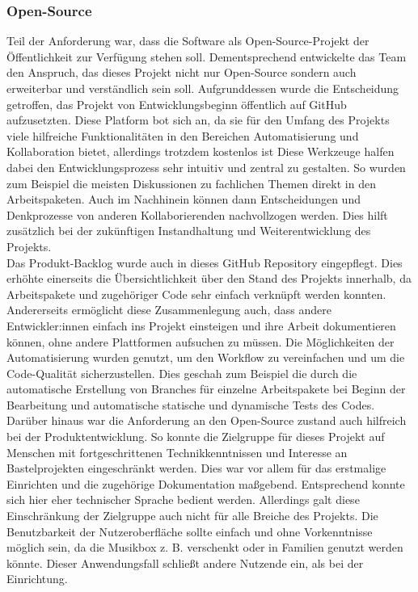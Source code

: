 \documentclass[10pt, a4paper, draft]{article}
\begin{document}
\subsubsection{Open-Source}
Teil der Anforderung war, dass die Software als Open-Source-Projekt der Öffentlichkeit zur Verfügung stehen soll.
Dementsprechend entwickelte das Team den Anspruch, das dieses Projekt nicht nur Open-Source sondern auch erweiterbar und verständlich sein soll.
Aufgrunddessen wurde die Entscheidung getroffen, das Projekt von Entwicklungsbeginn öffentlich auf GitHub aufzusetzten.
Diese Platform bot sich an, da sie für den Umfang des Projekts viele hilfreiche Funktionalitäten in den Bereichen Automatisierung und Kollaboration bietet, allerdings trotzdem kostenlos ist
Diese Werkzeuge halfen dabei den Entwicklungsprozess sehr intuitiv und zentral zu gestalten.
So wurden zum Beispiel die meisten Diskussionen zu fachlichen Themen direkt in den Arbeitspaketen.
Auch im Nachhinein können dann Entscheidungen und Denkprozesse von anderen Kollaborierenden nachvollzogen werden.
Dies hilft zusätzlich bei der zukünftigen Instandhaltung und Weiterentwicklung des Projekts.
\\
Das Produkt-Backlog wurde auch in dieses GitHub Repository eingepflegt.
Dies erhöhte einerseits die Übersichtlichkeit über den Stand des Projekts innerhalb, da Arbeitspakete und zugehöriger Code sehr einfach verknüpft werden konnten.
Andererseits ermöglicht diese Zusammenlegung auch, dass andere Entwickler:innen einfach ins Projekt einsteigen und ihre Arbeit dokumentieren können, ohne andere Plattformen aufsuchen zu müssen.
Die Möglichkeiten der Automatisierung wurden genutzt, um den Workflow zu vereinfachen und um die Code-Qualität sicherzustellen.
Dies geschah zum Beispiel die durch die automatische Erstellung von Branches für einzelne Arbeitspakete bei Beginn der Bearbeitung und automatische statische und dynamische Tests des Codes.
\\
Darüber hinaus war die Anforderung an den Open-Source zustand auch hilfreich bei der Produktentwicklung.
So konnte die Zielgruppe für dieses Projekt auf Menschen mit fortgeschrittenen Technikkenntnissen und Interesse an Bastelprojekten eingeschränkt werden.
Dies war vor allem für das erstmalige Einrichten und die zugehörige Dokumentation maßgebend.
Entsprechend konnte sich hier eher technischer Sprache bedient werden.
Allerdings galt diese Einschränkung der Zielgruppe auch nicht für alle Breiche des Projekts.
Die Benutzbarkeit der Nutzeroberfläche sollte einfach und ohne Vorkenntnisse möglich sein, da die Musikbox z. B. verschenkt oder in Familien genutzt werden könnte.
Dieser Anwendungsfall schließt andere Nutzende ein, als bei der Einrichtung.
\end{document}
